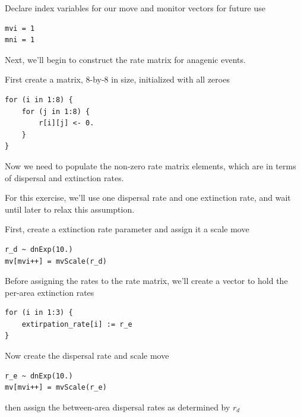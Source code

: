 Declare index variables for our move and monitor vectors for future use

\begin{snugshade}
\begin{lstlisting}
mvi = 1
mni = 1
\end{lstlisting}
\end{snugshade}


Next, we'll begin to construct the rate matrix for anagenic events.

First create a matrix, 8-by-8 in size, initialized with all zeroes

\begin{snugshade}
\begin{lstlisting}
for (i in 1:8) {
    for (j in 1:8) {
        r[i][j] <- 0.
    }
}
\end{lstlisting}
\end{snugshade}

Now we need to populate the non-zero rate matrix elements, which are in terms of dispersal and extinction rates.

For this exercise, we'll use one dispersal rate and one extinction rate, and wait until later to relax this assumption.

First, create a extinction rate parameter and assign it a scale move

\begin{snugshade}
\begin{lstlisting}
r_d ~ dnExp(10.)
mv[mvi++] = mvScale(r_d)
\end{lstlisting}
\end{snugshade}

Before assigning the rates to the rate matrix, we'll create a vector to hold the per-area extinction rates 

\begin{snugshade}
\begin{lstlisting}
for (i in 1:3) {
    extirpation_rate[i] := r_e
}
\end{lstlisting}
\end{snugshade}

Now create the dispersal rate and scale move

\begin{snugshade}
\begin{lstlisting}
r_e ~ dnExp(10.)
mv[mvi++] = mvScale(r_e)
\end{lstlisting}
\end{snugshade}

then assign the between-area dispersal rates as determined by {\tt $r_d$}

